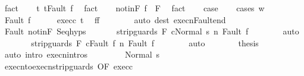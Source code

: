 \begin{isabellebody}
\ fact\isanewline
\ \ \isamarkupfalse%
\ t{\isacharcolon}\ {\isachardoublequoteopen}t{\isacharequal}Fault\ f{\isachardoublequoteclose}\ \isamarkupfalse%
\ fact\isanewline
\ \ \isamarkupfalse%
\ notinF{\isacharcolon}\ {\isachardoublequoteopen}f\ {\isasymnotin}\ F{\isachardoublequoteclose}\ \isamarkupfalse%
\ fact\isanewline
\ \ \isamarkupfalse%
\ {\isacharquery}case\isanewline
\ \ \isamarkupfalse%
\ {\isacharparenleft}cases\ w{\isacharparenright}\isanewline
\ \ \ \ \isamarkupfalse%
\ {\isacharparenleft}Fault\ f{\isacharprime}{\isacharparenright}\isanewline
\ \ \ \ \isamarkupfalse%
\ exec{\isacharunderscore}c{}\ t\ \isamarkupfalse%
\ {\isachardoublequoteopen}f{\isacharprime}{\isacharequal}f{\isachardoublequoteclose}\isanewline
\ \ \ \ \ \ \isamarkupfalse%
\ {\isacharparenleft}auto\ dest{\isacharcolon}\ execn{\isacharunderscore}Fault{\isacharunderscore}end{\isacharparenright}\isanewline
\ \ \ \ \isamarkupfalse%
\ Fault\ notinF\ Seq{\isachardot}hyps\ \isanewline
\ \ \ \ \isamarkupfalse%
\ {\isachardoublequoteopen}{\isasymGamma}{\isasymturnstile}{\isasymlangle}strip{\isacharunderscore}guards\ F\ c{}{\isacharcomma}Normal\ s{\isasymrangle}\ {\isacharequal}n{\isasymRightarrow}\ Fault\ f{\isachardoublequoteclose}\isanewline
\ \ \ \ \ \ \isamarkupfalse%
\ auto\isanewline
\ \ \ \ \isamarkupfalse%
\ \isamarkupfalse%
\ {\isachardoublequoteopen}{\isasymGamma}{\isasymturnstile}{\isasymlangle}strip{\isacharunderscore}guards\ F\ c{}{\isacharcomma}Fault\ f{\isasymrangle}\ {\isacharequal}n{\isasymRightarrow}\ Fault\ f{\isachardoublequoteclose}\isanewline
\ \ \ \ \ \ \isamarkupfalse%
\ auto\isanewline
\ \ \ \ \isamarkupfalse%
\ \isamarkupfalse%
\ {\isacharquery}thesis\isanewline
\ \ \ \ \ \ \isamarkupfalse%
\ {\isacharparenleft}auto\ intro{\isacharcolon}\ execn{\isachardot}intros{\isacharparenright}\isanewline
\ \ \isamarkupfalse%
\isanewline
\ \ \ \ \isamarkupfalse%
\ {\isacharparenleft}Normal\ s{\isacharprime}{\isacharparenright}\isanewline
\ \ \ \ \isamarkupfalse%
\ execn{\isacharunderscore}to{\isacharunderscore}execn{\isacharunderscore}strip{\isacharunderscore}guards\ {\isacharbrackleft}OF\ exec{\isacharunderscore}c{}{\isacharbrackright}\ \isanewline
\ \ \ \ \isamarkupfalse%

\end{isabellebody}

